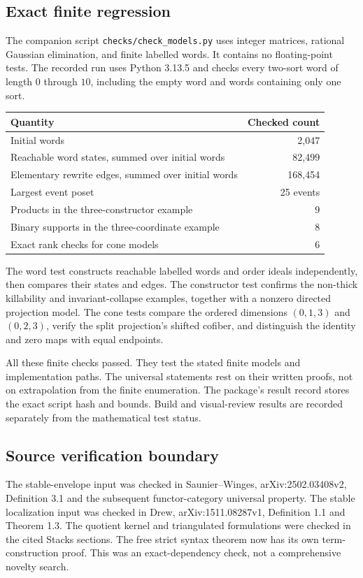 \documentclass[11pt]{article}
\theoremstyle{definition}
\theoremstyle{remark}
\begin{document}
\subsection{Exact finite regression}
The companion script \texttt{checks/check\_models.py} uses integer matrices, rational Gaussian elimination, and finite labelled words. It contains no floating-point tests. The recorded run uses Python 3.13.5 and checks every two-sort word of length $0$ through $10$, including the empty word and words containing only one sort.

\begin{center}
\begin{tabular}{lr}
\toprule
Quantity & Checked count\\
\midrule
Initial words & 2,047\\
Reachable word states, summed over initial words & 82,499\\
Elementary rewrite edges, summed over initial words & 168,454\\
Largest event poset & 25 events\\
Products in the three-constructor example & 9\\
Binary supports in the three-coordinate example & 8\\
Exact rank checks for cone models & 6\\
\bottomrule
\end{tabular}
\end{center}

The word test constructs reachable labelled words and order ideals independently, then compares their states and edges. The constructor test confirms the non-thick killability and invariant-collapse examples, together with a nonzero directed projection model. The cone tests compare the ordered dimensions $(0,1,3)$ and $(0,2,3)$, verify the split projection's shifted cofiber, and distinguish the identity and zero maps with equal endpoints.

All these finite checks passed. They test the stated finite models and implementation paths. The universal statements rest on their written proofs, not on extrapolation from the finite enumeration. The package's result record stores the exact script hash and bounds. Build and visual-review results are recorded separately from the mathematical test status.

\subsection{Source verification boundary}
The stable-envelope input was checked in Saunier--Winges, arXiv:2502.03408v2, Definition 3.1 and the subsequent functor-category universal property. The stable localization input was checked in Drew, arXiv:1511.08287v1, Definition 1.1 and Theorem 1.3. The quotient kernel and triangulated formulations were checked in the cited Stacks sections. The free strict syntax theorem now has its own term-construction proof. This was an exact-dependency check, not a comprehensive novelty search.
\end{document}
